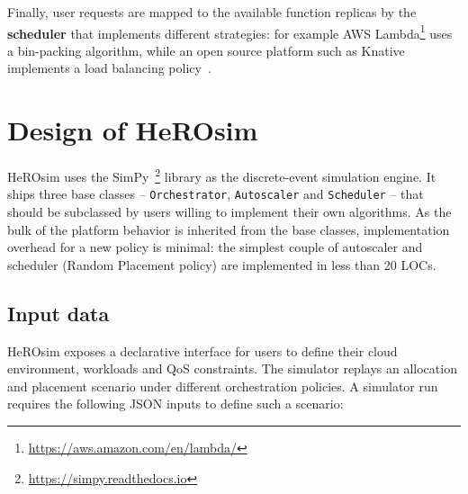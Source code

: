 Finally, user requests are mapped to the available function replicas by the \textbf{scheduler} that implements different strategies: for example AWS Lambda\footnote{\href{https://aws.amazon.com/en/lambda/}{https://aws.amazon.com/en/lambda/}} uses a bin-packing algorithm, while an open source platform such as Knative implements a load balancing policy~\cite{Lannurien2023}. %

\section{Design of HeROsim}
\label{section:herosim-herosim}



HeROsim uses the SimPy~\footnote{\href{https://simpy.readthedocs.io}{https://simpy.readthedocs.io}} library as the discrete-event simulation engine. It ships three base classes -- \texttt{Orchestrator}, \texttt{Autoscaler} and \texttt{Scheduler} -- that should be subclassed by users willing to implement their own  algorithms. As the bulk of the platform behavior is inherited from the base classes, implementation overhead for a new policy is minimal: the simplest couple of autoscaler and scheduler (Random Placement policy) are implemented in less than 20 LOCs.

\subsection{Input data}

HeROsim exposes a declarative interface for users to define their cloud environment, workloads and QoS constraints. The simulator replays an allocation and placement scenario under different orchestration policies. A simulator run requires the following JSON inputs to define such a scenario:

